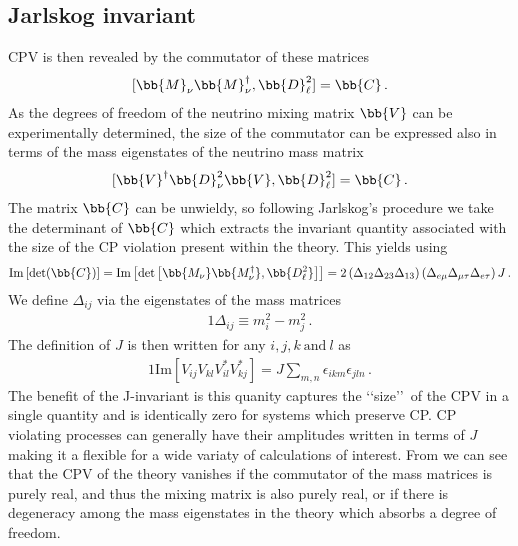 \subsection{Jarlskog invariant}
\noindent CPV is then revealed by the commutator of these matrices
\begin{alignat}{1}
	\label{comm:1} [\bb{M}_{\nu}\bb{M}_{\nu}^{\dagger},\bb{D}_{\ell}^{2}] = \bb{C}\,.
\end{alignat}
As the degrees of freedom of the neutrino mixing matrix $\bb{V}$ can be experimentally determined, the size of the commutator can be expressed also in terms of the mass eigenstates of the neutrino mass matrix
\begin{alignat}{1}
	\label{comm:2} [\bb{V}^{\dagger}\bb{D}_{\nu}^{2}\bb{V},\bb{D}_{\ell}^{2}] = \bb{C}\,.
\end{alignat}
The matrix $\bb{C}$ can be unwieldy, so following Jarlskog's procedure \ar we take the determinant of $\bb{C}$ which extracts the invariant quantity associated with the size of the CP violation present within the theory. \ar This yields using 
\begin{alignat}{1}
	\label{det:1} \mathrm{Im}\left[\mathrm{det}(\bb{C})\right]=\mathrm{Im}\left[\mathrm{det}\left[\bb{M_{\nu}}\bb{M_{\nu}^{\dagger}},\bb{D_{\ell}^{2}}\right]\right]=2\left(\Delta_{12}\Delta_{23}\Delta_{13}\right)\left(\Delta_{e\mu}\Delta_{\mu\tau}\Delta_{e\tau}\right)J\,.
\end{alignat}
We define $\Delta_{ij}$ via the eigenstates of the mass matrices
\begin{alignat}{1}
	\label{delta:1} \Delta_{ij}\equiv m^{2}_{i}-m^{2}_{j}\,.
\end{alignat}
The definition of $J$ is then written for any $i, j, k\ \mathrm{and}\ l$ as
\begin{alignat}{1}
	\label{j:1} \mathrm{Im}\left[V_{ij}V_{kl}V^{*}_{il}V^{*}_{kj}\right]=J\sum_{m,n}\epsilon_{ikm}\epsilon_{jln}\,.
\end{alignat}
The benefit of the J-invariant is this quanity captures the \lq\lq size\rq\rq\ of the CPV in a single quantity and is identically zero for systems which preserve CP. CP violating processes can generally have their amplitudes written in terms of $J$ making it a flexible for a wide variaty of calculations of interest. \ar From  we can see that the CPV of the theory vanishes if the commutator of the mass matrices is purely real, and thus the mixing matrix is also purely real, or if there is degeneracy among the mass eigenstates in the theory which absorbs a degree of freedom.

